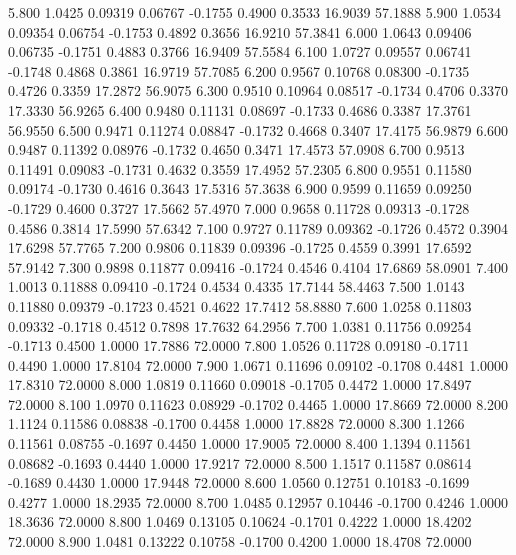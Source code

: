    5.800   1.0425   0.09319   0.06767  -0.1755   0.4900   0.3533  16.9039  57.1888
   5.900   1.0534   0.09354   0.06754  -0.1753   0.4892   0.3656  16.9210  57.3841
   6.000   1.0643   0.09406   0.06735  -0.1751   0.4883   0.3766  16.9409  57.5584
   6.100   1.0727   0.09557   0.06741  -0.1748   0.4868   0.3861  16.9719  57.7085
   6.200   0.9567   0.10768   0.08300  -0.1735   0.4726   0.3359  17.2872  56.9075
   6.300   0.9510   0.10964   0.08517  -0.1734   0.4706   0.3370  17.3330  56.9265
   6.400   0.9480   0.11131   0.08697  -0.1733   0.4686   0.3387  17.3761  56.9550
   6.500   0.9471   0.11274   0.08847  -0.1732   0.4668   0.3407  17.4175  56.9879
   6.600   0.9487   0.11392   0.08976  -0.1732   0.4650   0.3471  17.4573  57.0908
   6.700   0.9513   0.11491   0.09083  -0.1731   0.4632   0.3559  17.4952  57.2305
   6.800   0.9551   0.11580   0.09174  -0.1730   0.4616   0.3643  17.5316  57.3638
   6.900   0.9599   0.11659   0.09250  -0.1729   0.4600   0.3727  17.5662  57.4970
   7.000   0.9658   0.11728   0.09313  -0.1728   0.4586   0.3814  17.5990  57.6342
   7.100   0.9727   0.11789   0.09362  -0.1726   0.4572   0.3904  17.6298  57.7765
   7.200   0.9806   0.11839   0.09396  -0.1725   0.4559   0.3991  17.6592  57.9142
   7.300   0.9898   0.11877   0.09416  -0.1724   0.4546   0.4104  17.6869  58.0901
   7.400   1.0013   0.11888   0.09410  -0.1724   0.4534   0.4335  17.7144  58.4463
   7.500   1.0143   0.11880   0.09379  -0.1723   0.4521   0.4622  17.7412  58.8880
   7.600   1.0258   0.11803   0.09332  -0.1718   0.4512   0.7898  17.7632  64.2956
   7.700   1.0381   0.11756   0.09254  -0.1713   0.4500   1.0000  17.7886  72.0000
   7.800   1.0526   0.11728   0.09180  -0.1711   0.4490   1.0000  17.8104  72.0000
   7.900   1.0671   0.11696   0.09102  -0.1708   0.4481   1.0000  17.8310  72.0000
   8.000   1.0819   0.11660   0.09018  -0.1705   0.4472   1.0000  17.8497  72.0000
   8.100   1.0970   0.11623   0.08929  -0.1702   0.4465   1.0000  17.8669  72.0000
   8.200   1.1124   0.11586   0.08838  -0.1700   0.4458   1.0000  17.8828  72.0000
   8.300   1.1266   0.11561   0.08755  -0.1697   0.4450   1.0000  17.9005  72.0000
   8.400   1.1394   0.11561   0.08682  -0.1693   0.4440   1.0000  17.9217  72.0000
   8.500   1.1517   0.11587   0.08614  -0.1689   0.4430   1.0000  17.9448  72.0000
   8.600   1.0560   0.12751   0.10183  -0.1699   0.4277   1.0000  18.2935  72.0000
   8.700   1.0485   0.12957   0.10446  -0.1700   0.4246   1.0000  18.3636  72.0000
   8.800   1.0469   0.13105   0.10624  -0.1701   0.4222   1.0000  18.4202  72.0000
   8.900   1.0481   0.13222   0.10758  -0.1700   0.4200   1.0000  18.4708  72.0000

